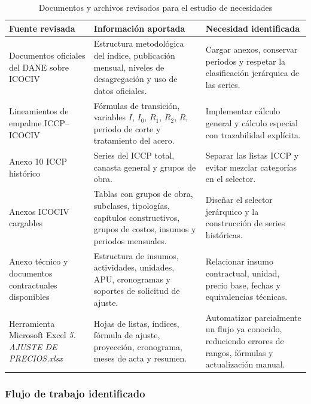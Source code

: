 \documentclass[12pt,letterpaper]{article}
\newcommand{\ICOCIV}{ICOCIV}
\newcommand{\ICCP}{ICCP}
\newcommand{\DANE}{DANE}
\begin{document}
\begin{table}[H]
\centering
\caption{Documentos y archivos revisados para el estudio de necesidades}
\label{tab:documentos_necesidades}
\vspace{\baselineskip}
\scriptsize
\begin{adjustbox}{max width=\textwidth}
\begin{tabularx}{\textwidth}{@{}p{3.6cm}YY@{}}
\toprule
\textbf{Fuente revisada} & \textbf{Información aportada} & \textbf{Necesidad identificada} \\
\midrule
Documentos oficiales del \DANE{} sobre \ICOCIV{} & Estructura metodológica del índice, publicación mensual, niveles de desagregación y uso de datos oficiales. & Cargar anexos, conservar periodos y respetar la clasificación jerárquica de las series. \\
Lineamientos de empalme \ICCP--\ICOCIV{} & Fórmulas de transición, variables \(I\), \(I_0\), \(R_1\), \(R_2\), \(R\), periodo de corte y tratamiento del acero. & Implementar cálculo general y cálculo especial con trazabilidad explícita. \\
Anexo 10 \ICCP{} histórico & Series del \ICCP{} total, canasta general y grupos de obra. & Separar las listas \ICCP{} y evitar mezclar categorías en el selector. \\
Anexos \ICOCIV{} cargables & Tablas con grupos de obra, subclases, tipologías, capítulos constructivos, grupos de costos, insumos y periodos mensuales. & Diseñar el selector jerárquico y la construcción de series históricas. \\
Anexo técnico y documentos contractuales disponibles & Estructura de insumos, actividades, unidades, APU, cronogramas y soportes de solicitud de ajuste. & Relacionar insumo contractual, unidad, precio base, fechas y equivalencias técnicas. \\
Herramienta Microsoft Excel \textit{5. AJUSTE DE PRECIOS.xlsx} & Hojas de listas, índices, fórmula de ajuste, proyección, cronograma, meses de acta y resumen. & Automatizar parcialmente un flujo ya conocido, reduciendo errores de rangos, fórmulas y actualización manual. \\
\bottomrule
\end{tabularx}
\end{adjustbox}
\end{table}

\subsubsection{Flujo de trabajo identificado}
\end{document}
